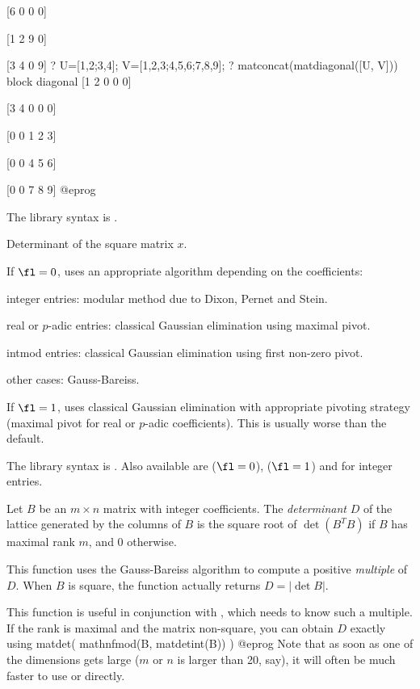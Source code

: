 [6 0 0 0]

[1 2 9 0]

[3 4 0 9]
? U=[1,2;3,4]; V=[1,2,3;4,5,6;7,8,9];
? matconcat(matdiagonal([U, V])) \\ block diagonal
[1 2 0 0 0]

[3 4 0 0 0]

[0 0 1 2 3]

[0 0 4 5 6]

[0 0 7 8 9]
@eprog

The library syntax is .

\label{se:matdet}
Determinant of the square matrix $x$.

If $\fl=0$, uses an appropriate algorithm depending on the coefficients:

\item integer entries: modular method due to Dixon, Pernet and Stein.

\item real or $p$-adic entries: classical Gaussian elimination using maximal
pivot.

\item intmod entries: classical Gaussian elimination using first non-zero
pivot.

\item other cases: Gauss-Bareiss.

If $\fl=1$, uses classical Gaussian elimination with appropriate pivoting
strategy (maximal pivot for real or $p$-adic coefficients). This is usually
worse than the default.

The library syntax is .
Also available are  ($\fl=0$),
 ($\fl=1$) and  for integer
entries.

\label{se:matdetint}
Let $B$ be an $m\times n$ matrix with integer coefficients. The
\emph{determinant} $D$ of the lattice generated by the columns of $B$ is
the square root of $\det(B^T B)$ if $B$ has maximal rank $m$, and $0$
otherwise.

This function uses the Gauss-Bareiss algorithm to compute a positive
\emph{multiple} of $D$. When $B$ is square, the function actually returns
$D = |\det B|$.

This function is useful in conjunction with , which needs to
know such a multiple. If the rank is maximal and the matrix non-square,
you can obtain $D$ exactly using
\bprog
  matdet( mathnfmod(B, matdetint(B)) )
@eprog\noindent
Note that as soon as one of the dimensions gets large ($m$ or $n$ is larger
than 20, say), it will often be much faster to use  or
 directly.

